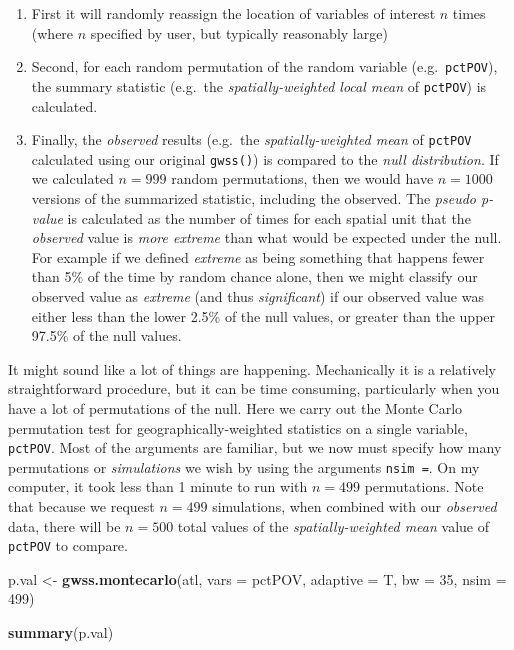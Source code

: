 \documentclass[
]{book}
\newenvironment{Shaded}{\begin{snugshade}}{\end{snugshade}}
\newcommand{\AttributeTok}[1]{\textcolor[rgb]{0.13,0.29,0.53}{#1}}
\newcommand{\DecValTok}[1]{\textcolor[rgb]{0.00,0.00,0.81}{#1}}
\newcommand{\FunctionTok}[1]{\textcolor[rgb]{0.13,0.29,0.53}{\textbf{#1}}}
\newcommand{\NormalTok}[1]{#1}
\newcommand{\OtherTok}[1]{\textcolor[rgb]{0.56,0.35,0.01}{#1}}
\newcommand{\StringTok}[1]{\textcolor[rgb]{0.31,0.60,0.02}{#1}}
\providecommand{\tightlist}{%
  \setlength{\itemsep}{0pt}\setlength{\parskip}{0pt}}
\begin{document}
\begin{enumerate}
\def\labelenumi{\arabic{enumi}.}
\tightlist
\item
  First it will randomly reassign the location of variables of interest \(n\) times (where \(n\) specified by user, but typically reasonably large)
\item
  Second, for each random permutation of the random variable (e.g.~\texttt{pctPOV}), the summary statistic (e.g.~the \emph{spatially-weighted local mean} of \texttt{pctPOV}) is calculated.\\
\item
  Finally, the \emph{observed} results (e.g.~the \emph{spatially-weighted mean} of \texttt{pctPOV} calculated using our original \texttt{gwss()}) is compared to the \emph{null distribution}. If we calculated \(n=999\) random permutations, then we would have \(n=1000\) versions of the summarized statistic, including the observed. The \emph{pseudo p-value} is calculated as the number of times for each spatial unit that the \emph{observed} value is \emph{more extreme} than what would be expected under the null. For example if we defined \emph{extreme} as being something that happens fewer than 5\% of the time by random chance alone, then we might classify our observed value as \emph{extreme} (and thus \emph{significant}) if our observed value was either less than the lower 2.5\% of the null values, or greater than the upper 97.5\% of the null values.
\end{enumerate}

It might sound like a lot of things are happening. Mechanically it is a relatively straightforward procedure, but it can be time consuming, particularly when you have a lot of permutations of the null. Here we carry out the Monte Carlo permutation test for geographically-weighted statistics on a single variable, \texttt{pctPOV}. Most of the arguments are familiar, but we now must specify how many permutations or \emph{simulations} we wish by using the arguments \texttt{nsim\ =}. On my computer, it took less than 1 minute to run with \(n=499\) permutations. Note that because we request \(n=499\) simulations, when combined with our \emph{observed} data, there will be \(n=500\) total values of the \emph{spatially-weighted mean} value of \texttt{pctPOV} to compare.

\begin{Shaded}
\begin{Highlighting}[]
\NormalTok{p.val }\OtherTok{\textless{}{-}} \FunctionTok{gwss.montecarlo}\NormalTok{(atl, }\AttributeTok{vars =} \StringTok{\textquotesingle{}pctPOV\textquotesingle{}}\NormalTok{, }
                         \AttributeTok{adaptive =}\NormalTok{ T,}
                         \AttributeTok{bw =} \DecValTok{35}\NormalTok{,}
                         \AttributeTok{nsim =} \DecValTok{499}\NormalTok{)}

\FunctionTok{summary}\NormalTok{(p.val)}
\end{Highlighting}
\end{Shaded}
\end{document}
